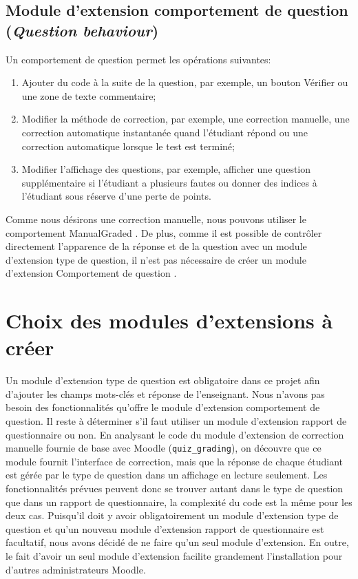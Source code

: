 \subsection{Module d'extension comportement de question (\textit{Question behaviour})}
Un comportement de question permet les op\'erations suivantes:
\begin{enumerate}
  \item Ajouter du code \`a la suite de la question, par exemple, un bouton \og V\'erifier \fg{} ou une zone de texte commentaire;
  
  \item Modifier la m\'ethode de correction, par exemple, une correction manuelle, une correction automatique instantan\'ee quand l'\'etudiant r\'epond ou une correction automatique lorsque le test est termin\'e;
  
  \item Modifier l'affichage des questions, par exemple, afficher une question suppl\'ementaire si l'\'etudiant a plusieurs fautes ou donner des indices \`a l'\'etudiant sous r\'eserve d'une perte de points.
\end{enumerate}
Comme nous d\'esirons une correction manuelle, nous pouvons utiliser le comportement \og ManualGraded \fg{}.
De plus, comme il est possible de contr\^oler directement l'apparence de la r\'eponse et de la question avec un module d'extension type de question, il n'est pas n\'ecessaire de cr\'eer un module d'extension \og Comportement de question \fg{}.
\section{Choix des modules d'extensions \`a cr\'eer}
Un module d'extension type de question est obligatoire dans ce projet afin d'ajouter les champs mots-cl\'es et r\'eponse de l'enseignant.
Nous n'avons pas besoin des fonctionnalit\'es qu'offre le module d'extension comportement de question.
Il reste \`a d\'eterminer s'il faut utiliser un module d'extension rapport de questionnaire ou non.
En analysant le code du module d'extension de correction manuelle fournie de base avec Moodle (\texttt{quiz\_grading}), on d\'ecouvre que ce module fournit l'interface de correction, mais que la r\'eponse de chaque \'etudiant est g\'er\'ee par le type de question dans un affichage en lecture seulement.
Les fonctionnalit\'es pr\'evues peuvent donc se trouver autant dans le type de question que dans un rapport de questionnaire, la complexit\'e du code est la m\^eme pour les deux cas.
Puisqu'il doit y avoir obligatoirement un module d'extension type de question et qu'un nouveau module d'extension rapport de questionnaire est facultatif, nous avons d\'ecid\'e de ne faire qu'un seul module d'extension.
En outre, le fait d'avoir un seul module d'extension facilite grandement l'installation pour d'autres administrateurs Moodle.